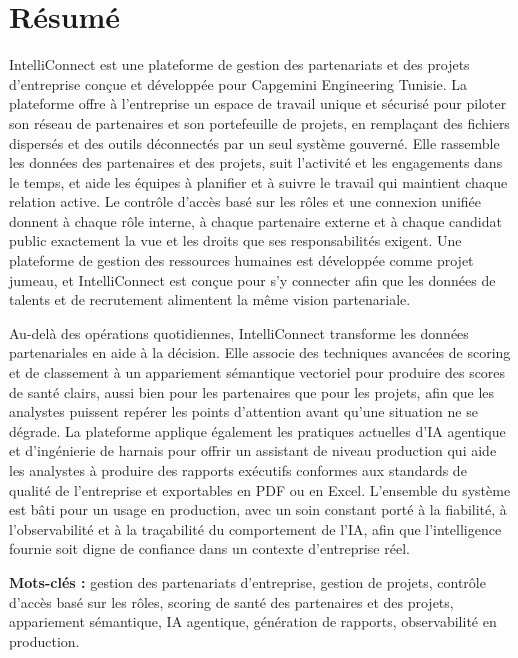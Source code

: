 \chapter*{Résumé}

IntelliConnect est une plateforme de gestion des partenariats et des projets d'entreprise conçue et développée pour Capgemini Engineering Tunisie. La plateforme offre à l'entreprise un espace de travail unique et sécurisé pour piloter son réseau de partenaires et son portefeuille de projets, en remplaçant des fichiers dispersés et des outils déconnectés par un seul système gouverné. Elle rassemble les données des partenaires et des projets, suit l'activité et les engagements dans le temps, et aide les équipes à planifier et à suivre le travail qui maintient chaque relation active. Le contrôle d'accès basé sur les rôles et une connexion unifiée donnent à chaque rôle interne, à chaque partenaire externe et à chaque candidat public exactement la vue et les droits que ses responsabilités exigent. Une plateforme de gestion des ressources humaines est développée comme projet jumeau, et IntelliConnect est conçue pour s'y connecter afin que les données de talents et de recrutement alimentent la même vision partenariale.

Au-delà des opérations quotidiennes, IntelliConnect transforme les données partenariales en aide à la décision. Elle associe des techniques avancées de scoring et de classement à un appariement sémantique vectoriel pour produire des scores de santé clairs, aussi bien pour les partenaires que pour les projets, afin que les analystes puissent repérer les points d'attention avant qu'une situation ne se dégrade. La plateforme applique également les pratiques actuelles d'IA agentique et d'ingénierie de harnais pour offrir un assistant de niveau production qui aide les analystes à produire des rapports exécutifs conformes aux standards de qualité de l'entreprise et exportables en PDF ou en Excel. L'ensemble du système est bâti pour un usage en production, avec un soin constant porté à la fiabilité, à l'observabilité et à la traçabilité du comportement de l'IA, afin que l'intelligence fournie soit digne de confiance dans un contexte d'entreprise réel.

\bigskip
\noindent\textbf{Mots-clés :} gestion des partenariats d'entreprise, gestion de projets, contrôle d'accès basé sur les rôles, scoring de santé des partenaires et des projets, appariement sémantique, IA agentique, génération de rapports, observabilité en production.
